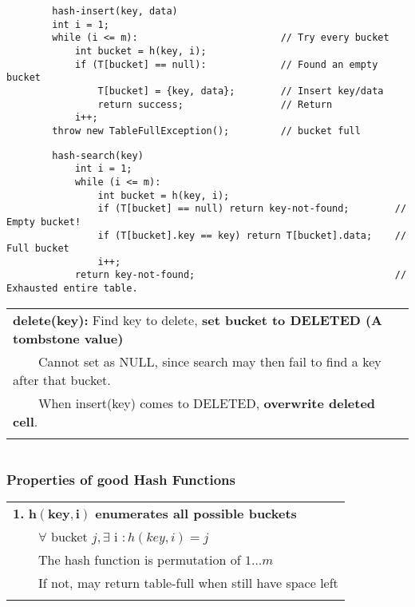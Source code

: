 \documentclass{article}
\newcommand{\tabitem}{~~\llap{\textbullet}~~}
\begin{document}
    \begin{verbatim}
        hash-insert(key, data)
        int i = 1;
        while (i <= m):                         // Try every bucket
            int bucket = h(key, i);
            if (T[bucket] == null):             // Found an empty bucket
                T[bucket] = {key, data};        // Insert key/data
                return success;                 // Return
            i++;
        throw new TableFullException();         // bucket full
    \end{verbatim}

    \begin{verbatim}
        hash-search(key)
            int i = 1;
            while (i <= m):
                int bucket = h(key, i);
                if (T[bucket] == null) return key-not-found;        // Empty bucket!
                if (T[bucket].key == key) return T[bucket].data;    // Full bucket
                i++;
            return key-not-found;                                   // Exhausted entire table.
    \end{verbatim}

    \begin{tabular}{l}
        \textbf{delete(key):} Find key to delete, \textbf{set bucket to DELETED (A tombstone value)}\\
        \tabitem Cannot set as NULL, since search may then fail to find a key after that bucket.\\
        \tabitem When insert(key) comes to DELETED, \textbf{overwrite deleted cell}.\\\\
    \end{tabular}

    \begin{tabular}{l}
        
    \end{tabular}

    \subsubsection{Properties of good Hash Functions}

    
    \begin{tabular}{l}
        \textbf{1.} $\bm{h(key, i)}$ \textbf{enumerates all possible buckets}\\
        \tabitem $\forall$ bucket $j, \exists$ i $: h(key, i) = j$\\
        \tabitem The hash function is permutation of ${1...m}$\\
        \tabitem If not, may return table-full when still have space left\\\\
    \end{tabular}
    
\end{document}
